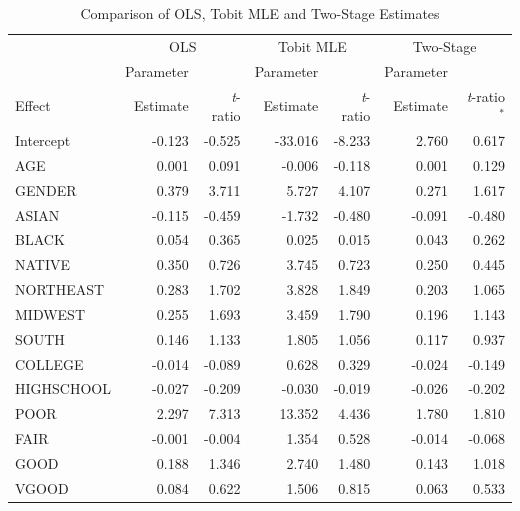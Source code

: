 \clearpage


\begin{table}[h]
\caption{\label{T16:MEPSRegr} Comparison of OLS, Tobit MLE and
Two-Stage Estimates} 
\begin{tabular}{lrrrrrr}
 \hline &
\multicolumn{2}{c}{OLS} & \multicolumn{2}{c}{Tobit MLE} &
\multicolumn{2}{c}{Two-Stage} \\
& Parameter &  & Parameter &  & Parameter &  \\
\multicolumn{1}{l}{Effect} & Estimate & \textit{t}-ratio & Estimate
& \textit{t}-ratio & Estimate & \textit{t}-ratio$^{\ast}$  \\ \hline
 Intercept &     -0.123 &     -0.525 &    -33.016 &     -8.233 &      2.760 &      0.617 \\
       AGE &      0.001 &      0.091 &     -0.006 &     -0.118 &      0.001 &      0.129 \\
    GENDER &      0.379 &      3.711 &      5.727 &      4.107 &      0.271 &      1.617 \\
     ASIAN &     -0.115 &     -0.459 &     -1.732 &     -0.480 &     -0.091 &     -0.480 \\
     BLACK &      0.054 &      0.365 &      0.025 &      0.015 &      0.043 &      0.262 \\
    NATIVE &      0.350 &      0.726 &      3.745 &      0.723 &      0.250 &      0.445 \\
 NORTHEAST &      0.283 &      1.702 &      3.828 &      1.849 &      0.203 &      1.065 \\
   MIDWEST &      0.255 &      1.693 &      3.459 &      1.790 &      0.196 &      1.143 \\
     SOUTH &      0.146 &      1.133 &      1.805 &      1.056 &      0.117 &      0.937 \\
     \hline
   COLLEGE &     -0.014 &     -0.089 &      0.628 &      0.329 &     -0.024 &     -0.149 \\
HIGHSCHOOL &     -0.027 &     -0.209 &     -0.030 &     -0.019 &     -0.026 &     -0.202 \\
     \hline
      POOR &      2.297 &      7.313 &     13.352 &      4.436 &      1.780 &      1.810 \\
      FAIR &     -0.001 &     -0.004 &      1.354 &      0.528 &     -0.014 &     -0.068 \\
      GOOD &      0.188 &      1.346 &      2.740 &      1.480 &      0.143 &      1.018 \\
     VGOOD &      0.084 &      0.622 &      1.506 &      0.815 &      0.063 &      0.533 \\

\end{tabular}
\end{table}
